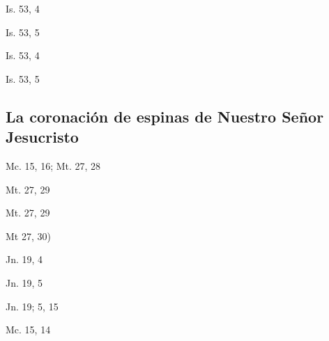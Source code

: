 \documentclass[a4paper,11pt,sans]{article}
\begin{document}
      \begin{center}
        Is. 53, 4
      \end{center}

      \begin{center}
        Is. 53, 5
      \end{center}

      \begin{center}
        Is. 53, 4 
      \end{center}

      \begin{center}
        Is. 53, 5
      \end{center}
      
    \subsection*{\hfil La coronación de espinas de Nuestro Señor Jesucristo \hfil}
      
      \begin{center}
        Mc. 15, 16; Mt. 27, 28
      \end{center}

      \begin{center}
        Mt. 27, 29
      \end{center}

      \begin{center}
        Mt. 27, 29
      \end{center}

      \begin{center}
        Mt 27, 30)
      \end{center}

      \begin{center}
        Jn. 19, 4
      \end{center}

      \begin{center}
        Jn. 19, 5
      \end{center}

      \begin{center}
        Jn. 19; 5, 15
      \end{center}

      \begin{center}
        Mc. 15, 14
      \end{center}
\end{document}
